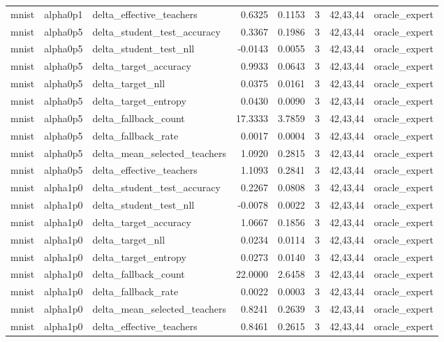 \begin{tabular}{lllrrrll}
mnist & alpha0p1 & delta\_effective\_teachers & 0.6325 & 0.1153 & 3 & 42,43,44 & oracle\_expert \\
mnist & alpha0p5 & delta\_student\_test\_accuracy & 0.3367 & 0.1986 & 3 & 42,43,44 & oracle\_expert \\
mnist & alpha0p5 & delta\_student\_test\_nll & -0.0143 & 0.0055 & 3 & 42,43,44 & oracle\_expert \\
mnist & alpha0p5 & delta\_target\_accuracy & 0.9933 & 0.0643 & 3 & 42,43,44 & oracle\_expert \\
mnist & alpha0p5 & delta\_target\_nll & 0.0375 & 0.0161 & 3 & 42,43,44 & oracle\_expert \\
mnist & alpha0p5 & delta\_target\_entropy & 0.0430 & 0.0090 & 3 & 42,43,44 & oracle\_expert \\
mnist & alpha0p5 & delta\_fallback\_count & 17.3333 & 3.7859 & 3 & 42,43,44 & oracle\_expert \\
mnist & alpha0p5 & delta\_fallback\_rate & 0.0017 & 0.0004 & 3 & 42,43,44 & oracle\_expert \\
mnist & alpha0p5 & delta\_mean\_selected\_teachers & 1.0920 & 0.2815 & 3 & 42,43,44 & oracle\_expert \\
mnist & alpha0p5 & delta\_effective\_teachers & 1.1093 & 0.2841 & 3 & 42,43,44 & oracle\_expert \\
mnist & alpha1p0 & delta\_student\_test\_accuracy & 0.2267 & 0.0808 & 3 & 42,43,44 & oracle\_expert \\
mnist & alpha1p0 & delta\_student\_test\_nll & -0.0078 & 0.0022 & 3 & 42,43,44 & oracle\_expert \\
mnist & alpha1p0 & delta\_target\_accuracy & 1.0667 & 0.1856 & 3 & 42,43,44 & oracle\_expert \\
mnist & alpha1p0 & delta\_target\_nll & 0.0234 & 0.0114 & 3 & 42,43,44 & oracle\_expert \\
mnist & alpha1p0 & delta\_target\_entropy & 0.0273 & 0.0140 & 3 & 42,43,44 & oracle\_expert \\
mnist & alpha1p0 & delta\_fallback\_count & 22.0000 & 2.6458 & 3 & 42,43,44 & oracle\_expert \\
mnist & alpha1p0 & delta\_fallback\_rate & 0.0022 & 0.0003 & 3 & 42,43,44 & oracle\_expert \\
mnist & alpha1p0 & delta\_mean\_selected\_teachers & 0.8241 & 0.2639 & 3 & 42,43,44 & oracle\_expert \\
mnist & alpha1p0 & delta\_effective\_teachers & 0.8461 & 0.2615 & 3 & 42,43,44 & oracle\_expert \\

\end{tabular}
